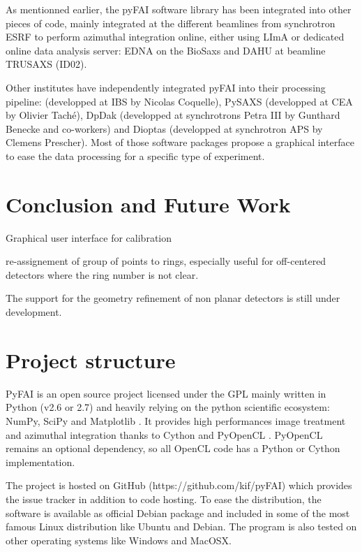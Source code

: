 \documentclass[preprint]{iucr}
\begin{document}
As mentionned earlier, the pyFAI software library has been integrated
into other pieces of code, mainly integrated at the different beamlines from
synchrotron ESRF to perform azimuthal integration online, either using LImA or
dedicated online data analysis server: EDNA\cite{edna} on the BioSaxs\cite{bm29}
and DAHU at beamline TRUSAXS (ID02). 

Other institutes have independently integrated pyFAI into their processing
pipeline:  (developped at IBS by Nicolas Coquelle), PySAXS
(developped at CEA by Olivier Taché), DpDak (developped at synchrotrons Petra
III by Gunthard Benecke and co-workers) \cite{dpdak}
and Dioptas (developped at synchrotron APS by Clemens Prescher). 
Most of those software packages propose a graphical interface to ease the
data processing for a specific type of experiment. 

\section{Conclusion and Future Work}


Graphical user interface for calibration

re-assignement of group of points to rings, especially useful for off-centered
detectors where the ring number is not clear.

The support for the geometry refinement of non planar detectors is still under
development.




\appendix
\section{Project structure}
PyFAI is an open source project licensed under the GPL mainly written in Python (v2.6 or 2.7)
and heavily relying on the python scientific ecosystem: NumPy\cite{numpy},
SciPy \cite{scipy} and Matplotlib \cite{matplotlib}.
It provides high performances image treatment and azimuthal integration thanks
to Cython \cite{cython} and PyOpenCL \cite{pyopencl}. 
PyOpenCL remains an optional dependency, so all OpenCL code has a
Python or Cython implementation.

The project is hosted on GitHub (https://github.com/kif/pyFAI) which provides
the issue tracker in addition to code hosting.
To ease the distribution, the
software is available as official Debian package and included in some of the
most famous Linux distribution like Ubuntu and Debian.
The program is also tested on other operating systems like Windows and
MacOSX.
\end{document}
